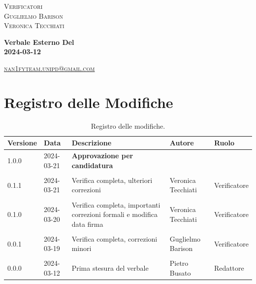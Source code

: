 \documentclass[8pt]{article}
\begin{document}
\begin{titlepage}
\begin{minipage}[t]{0.47\textwidth}
		{\large{\textsc{Verificatori}}
			\vspace{3mm}
			{\\\large{\textsc{Guglielmo Barison}\\}} %
			{\large{\textsc{Veronica Tecchiati}}}
			
		}
		\vspace{4mm}\vspace{4mm}
	\end{minipage}
	\vspace{4cm}
	\begin{center}
		\begin{flushright}
			{\fontsize{30pt}{52pt}\selectfont \textbf{Verbale Esterno Del\\2024-03-12\\}} %
		\end{flushright}
		\vspace{3cm}
	\end{center}
	\vspace{7.5 cm}
	{\small \textsc{\href{mailto: nan1fyteam.unipd@gmail.com}{nan1fyteam.unipd@gmail.com}}}
\end{titlepage}
\pagestyle{mystyle}
\section*{Registro delle Modifiche}
\begin{table}[ht!]	
	\centering
	\begin{tabular}{p{1.2cm} p{2cm} p{6cm} p{3cm} p{2cm}}
		\toprule
		\textbf{Versione}& \textbf{Data} & \textbf{Descrizione} & \textbf{Autore} & \textbf{Ruolo} \\
		\midrule
		1.0.0 & 2024-03-21 & \textbf{Approvazione per candidatura} & & \\\\
		0.1.1 & 2024-03-21 & Verifica completa, ulteriori correzioni & Veronica Tecchiati & Verificatore \\\\
		0.1.0 & 2024-03-20 & Verifica completa, importanti correzioni formali e modifica data firma & Veronica Tecchiati & Verificatore \\\\
		0.0.1 & 2024-03-19 & Verifica completa, correzioni minori & Guglielmo Barison & Verificatore \\\\
		0.0.0 & 2024-03-12 & Prima stesura del verbale & Pietro Busato & Redattore \\
		\bottomrule
	\end{tabular}
	\caption{Registro delle modifiche.}
	\label{table:Registro delle modifiche}
\end{table}
\newpage
\tableofcontents
\clearpage
\newpage
\justifying
\end{document}
